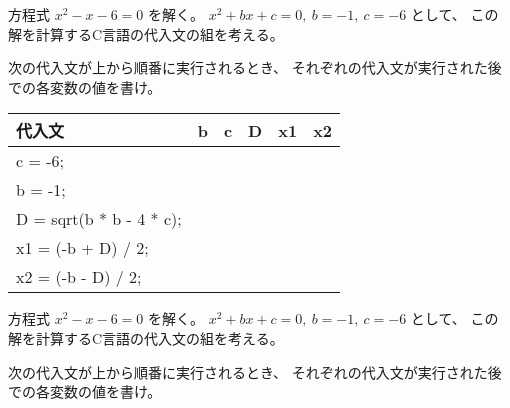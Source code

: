 \documentclass[12pt,a4j]{jarticle}
\newcounter{toi}
\def\toi{%
\bigskip\bigskip\noindent
\addtocounter{toi}{1}
\shadowbox{\bfseries\large 問\thetoi}
\nopagebreak[4]\bigskip\nopagebreak[4]
}
\begin{document}





\toi

方程式 $x^2 - x - 6 = 0$ を解く。
$x^2 + bx + c = 0,\ b = -1,\ c = -6$ として、
この解を計算するC言語の代入文の組を考える。

次の代入文が上から順番に実行されるとき、
それぞれの代入文が実行された後での各変数の値を書け。

\begin{center}
 \ttfamily%
 \begin{tabular}{|l|c|c|c|c|c|}\hline
 代入文 & b & c & D & x1 & x2\\ \hline\hline
 c = -6; & & && & \\  \cline{2-6}
 b = -1; & & && & \\  \cline{2-6}
 D = sqrt(b * b - 4 * c); &&&  & & \\  \cline{2-6}
 x1 = (-b + D) / 2; & & && & \\  \cline{2-6}
 x2 = (-b - D) / 2; & & && & \\  \hline
 \end{tabular}
\end{center}








\toi

方程式 $x^2 - x - 6 = 0$ を解く。
$x^2 + bx + c = 0,\ b = -1,\ c = -6$ として、
この解を計算するC言語の代入文の組を考える。

次の代入文が上から順番に実行されるとき、
それぞれの代入文が実行された後での各変数の値を書け。

\begin{center}
\end{center}
\end{document}
